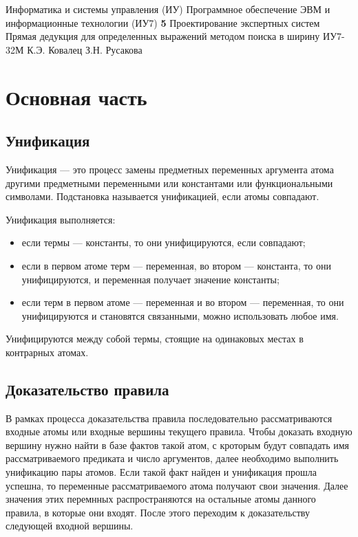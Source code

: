 \documentclass{bmstu}
\begin{document}
\makereporttitle
{Информатика и системы управления (ИУ)}
{Программное обеспечение ЭВМ и информационные технологии (ИУ7)}
{\textbf{5}}
{Проектирование экспертных систем}
{Прямая дедукция для определенных выражений методом поиска в ширину}
{}
{ИУ7-32М}
{К.Э. Ковалец}
{З.Н. Русакова}


\setcounter{page}{2}
\renewcommand{\contentsname}{Содержание} 
\tableofcontents


\chapter{Основная часть}

\section{Унификация}

Унификация --- это процесс замены предметных переменных аргумента атома другими предметными переменными или константами или функциональными символами. Подстановка называется унификацией, если атомы совпадают.

Унификация выполняется:
\begin{itemize}
    \item если термы --- константы, то они унифицируются, если совпадают;
    \item если в первом атоме терм --- переменная, во втором --- константа, то они унифицируются, и переменная получает значение константы;
    \item если терм в первом атоме --- переменная и во втором --- переменная, то они унифицируются и становятся связанными, можно использовать любое имя.
\end{itemize}

Унифицируются между собой термы, стоящие на одинаковых местах в контрарных атомах.

\section{Доказательство правила}

В рамках процесса доказательства правила последовательно рассматриваются входные атомы или входные вершины текущего правила. Чтобы доказать входную вершину нужно найти в базе фактов такой атом, с кроторым будут совпадать имя рассматриваемого предиката и число аргументов, далее необходимо выполнить унификацию пары атомов. Если такой факт найден и унификация прошла успешна, то переменные рассматриваемого атома получают свои значения. Далее значения этих перемнных распространяются на остальные атомы данного правила, в которые они входят. После этого переходим к доказательству следующей входной вершины.
\end{document}
